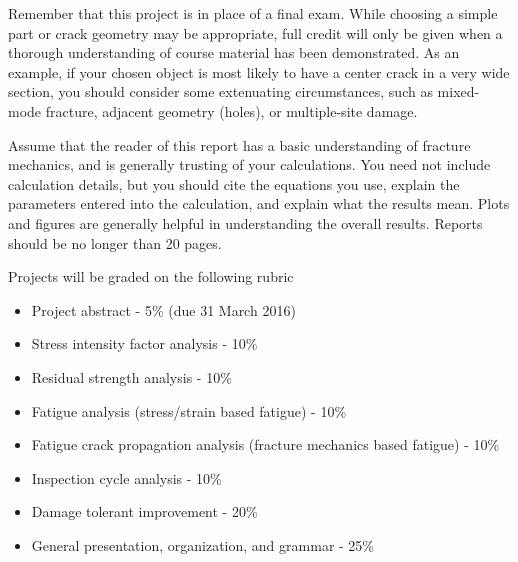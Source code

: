 \documentclass[12pt, oneside]{article}
\begin{document}
Remember that this project is in place of a final exam.
While choosing a simple part or crack geometry may be appropriate, full credit will only be given when a thorough understanding of course material has been demonstrated.
As an example, if your chosen object is most likely to have a center crack in a very wide section, you should consider some extenuating circumstances, such as mixed-mode fracture, adjacent geometry (holes), or multiple-site damage.

Assume that the reader of this report has a basic understanding of fracture mechanics, and is generally trusting of your calculations.
You need not include calculation details, but you should cite the equations you use, explain the parameters entered into the calculation, and explain what the results mean.
Plots and figures are generally helpful in understanding the overall results.
Reports should be no longer than 20 pages.

\newpage
Projects will be graded on the following rubric
\begin{itemize}
	\item Project abstract - 5\% (due 31 March 2016)
	\item Stress intensity factor analysis - 10\%
	\item Residual strength analysis - 10\%
	\item Fatigue analysis (stress/strain based fatigue) - 10\%
	\item Fatigue crack propagation analysis (fracture mechanics based fatigue) - 10\%
	\item Inspection cycle analysis - 10\%
	\item Damage tolerant improvement - 20\%
	\item General presentation, organization, and grammar - 25\%
\end{itemize}
\end{document}
